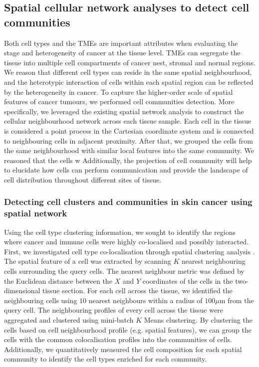 \subsection{Spatial cellular network analyses to detect cell communities}
Both cell types and the TMEs are important attributes when evaluating the stage and heterogeneity of cancer at the tissue level. TMEs can segregate the tissue into multiple cell compartments of cancer nest, stromal and normal regions. We reason that different cell types can reside in the same spatial neighbourhood, and the heterotypic interaction of cells within each spatial region can be reflected by the heterogeneity in cancer. To capture the higher-order scale of spatial features of cancer tumours, we performed cell communities detection. More specifically, we leveraged the existing spatial network analysis to construct the cellular neighbourhood network across each tissue sample. Each cell in the tissue is considered a point process in the Cartesian coordinate system and is connected to neighbouring cells in adjacent proximity. After that, we grouped the cells from the same neighbourhood with similar local features into the same community. We reasoned that the cells w Additionally, the projection of cell community will help to elucidate how cells can perform communication and provide the landscape of cell distribution throughout different sites of tissue. 

\subsubsection{Detecting cell clusters and communities in skin cancer using spatial network}
\label{Sec:3_cell_communities_and_coocurrence}	%
Using the cell type clustering information, we sought to identify the regions where cancer and immune cells were highly co-localised and possibly interacted. First, we investigated cell type co-localisation through spatial clustering analysis \cite{schurch2020coordinated}. The spatial feature of a cell was extracted by scanning $K$ nearest neighbouring cells surrounding the query cells. The nearest neighbour metric was defined by the Euclidean distance between the $X$ and $Y$ coordinates of the cells in the two-dimensional tissue section. For each cell across the tissue, we identified the neighbouring cells using $10$ nearest neighbours within a radius of $100\mu$m from the query cell. The neighbouring profiles of every cell across the tissue were aggregated and clustered using mini-batch $K$ Means clustering. By clustering the cells based on cell neighbourhood profile (e.g. spatial features), we can group the cells with the common colocalisation profiles into the communities of cells. Additionally, we quantitatively measured the cell composition for each spatial community to identify the cell types enriched for each community. 

